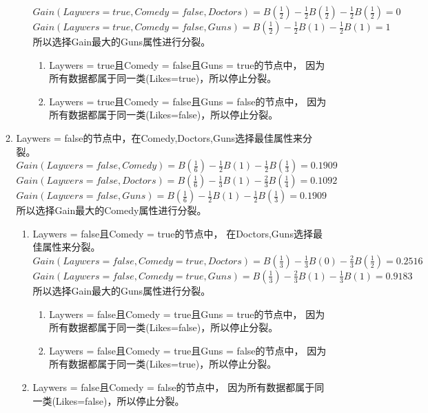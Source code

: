 \documentclass[a4paper, 11pt]{article}
\begin{document}
\begin{enumerate}[(a)]
\begin{enumerate}[(1)]
\begin{enumerate}
        $Gain(Laywers=true,Comedy=false,Doctors) = B(\frac{1}{2})-
        \frac{1}{2}B(\frac{1}{2})-\frac{1}{2}B(\frac{1}{2}) = 0$\\
        $Gain(Laywers=true,Comedy=false,Guns) = B(\frac{1}{2})-
        \frac{1}{2}B(1)-\frac{1}{2}B(1) = 1$\\
        所以选择Gain最大的Guns属性进行分裂。
        \begin{enumerate}
          \item Laywers = true且Comedy = false且Guns = true的节点中，
          因为所有数据都属于同一类(Likes=true)，所以停止分裂。
          \item Laywers = true且Comedy = false且Guns = false的节点中，
          因为所有数据都属于同一类(Likes=false)，所以停止分裂。
        \end{enumerate}
      \end{enumerate}
    \item Laywers = false的节点中，在Comedy,Doctors,Guns选择最佳属性来分裂。\\
    $Gain(Laywers=false,Comedy) = B(\frac{1}{6})-
    \frac{1}{2}B(1)-\frac{1}{2}B(\frac{1}{3}) = 0.1909$\\
    $Gain(Laywers=false,Doctors) = B(\frac{1}{6})-
    \frac{1}{3}B(1)-\frac{2}{3}B(\frac{1}{4}) = 0.1092$\\
    $Gain(Laywers=false,Guns) = B(\frac{1}{6})-
    \frac{1}{2}B(1)-\frac{1}{2}B(\frac{1}{3}) = 0.1909$\\
    所以选择Gain最大的Comedy属性进行分裂。

      \begin{enumerate}
        \item Laywers = false且Comedy = true的节点中，
        在Doctors,Guns选择最佳属性来分裂。\\
        $Gain(Laywers=false,Comedy=true,Doctors) = B(\frac{1}{3})-
        \frac{1}{3}B(0)-\frac{2}{3}B(\frac{1}{2}) = 0.2516$\\
        $Gain(Laywers=false,Comedy=true,Guns) = B(\frac{1}{3})-
        \frac{2}{3}B(1)-\frac{1}{3}B(1) = 0.9183$\\
        所以选择Gain最大的Guns属性进行分裂。
          \begin{enumerate}
            \item Laywers = false且Comedy = true且Guns = true的节点中，
            因为所有数据都属于同一类(Likes=false)，所以停止分裂。
            \item Laywers = false且Comedy = true且Guns = false的节点中，
            因为所有数据都属于同一类(Likes=true)，所以停止分裂。
          \end{enumerate}

        \item Laywers = false且Comedy = false的节点中，
        因为所有数据都属于同一类(Likes=false)，所以停止分裂。
      \end{enumerate}
  \end{enumerate}
\end{enumerate}
\end{document}
